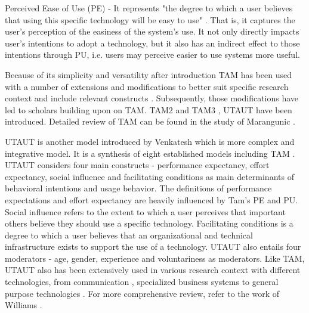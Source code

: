 \documentclass[a4paper,12pt]{article}
\newcommand{\citeyearonly}[1]{\citeyearpar{#1}}
\begin{document}
Perceived Ease of Use (PE) - It represents "the degree to which a user believes that using this specific technology will be easy to use" \citep{davis1985technology}. That is, it captures the user's perception of the easiness of the system's use. It not only directly impacts user's intentions to adopt a technology, but it also has an indirect effect to those intentions through PU, i.e. users may perceive easier to use systems more useful.  

Because of its simplicity and versatility after introduction TAM has been used with a number of extensions and modifications to better suit specific research context and include relevant constructs \citep{amoako2004extension, burton2006mediationextension, featherman2003predictingextension}. Subsequently, those modifications have led to scholars building upon on TAM. TAM2 \citep{venkateshDeterminantsPerceivedEase2000} and TAM3 \citep{venkateshTechnologyAcceptanceModel2008}, UTAUT \citep{venkatesh2003utaut} have been introduced. Detailed review of TAM can be found in the study of Marangunic \citeyearonly{marangunic2015technology}.

UTAUT is another model introduced by Venkatesh which is more complex and integrative model. It is a synthesis of eight established models including TAM \citep{venkatesh2003utaut}. UTAUT considers four main constructs - performance expectancy, effort expectancy, social influence and facilitating conditions as main determinants of behavioral intentions and usage behavior. The definitions of performance expectations and effort expectancy are heavily influenced by Tam's PE and PU. Social influence refers to the extent to which a user perceives that important others believe they should use a specific technology. Facilitating conditions is a degree to which a user believes that an organizational and technical infrastructure exists to support the use of a technology. UTAUT also entails four moderators - age, gender, experience and voluntariness as moderators. Like TAM, UTAUT also has been extensively used in various research context with different technologies, from communication \citep{wu2007empirical}, specialized business systems \citep{kijsanayotin2009factors} to general purpose technologies \citep{abu2010internet}. For more comprehensive review, refer to the work of Williams \citeyearonly{williams2015unified}. 
\end{document}
